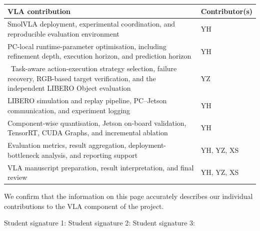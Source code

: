 \documentclass[11pt,a4paper]{article}
\begin{document}
\begin{center}
  \small
  \setlength{\tabcolsep}{5pt}
  \renewcommand{\arraystretch}{1.15}
  \begin{tabular}{@{}p{}p{}@{}}
    \toprule
    VLA contribution & Contributor(s) \\
    \midrule
    SmolVLA deployment, experimental coordination, and reproducible
    evaluation environment
      & YH \\

    PC-local runtime-parameter optimisation, including refinement depth,
    execution horizon, and prediction horizon
      & YH \\

    \
    Task-aware action-execution strategy selection, failure recovery, RGB-based target verification, and the independent LIBERO Object evaluation
      & YZ \\

    LIBERO simulation and replay pipeline, PC--Jetson communication, and
    experiment logging
      & YH \\

    Component-wise quantisation, Jetson on-board validation, TensorRT,
    CUDA Graphs, and incremental ablation
      & YH \\

    Evaluation metrics, result aggregation, deployment-bottleneck analysis,
    and reporting support
      & YH, YZ, XS \\

    VLA manuscript preparation, result interpretation, and final review
      & YH, YZ, XS \\
    \bottomrule
  \end{tabular}
\end{center}

\medskip

\noindent
We confirm that the information on this page accurately describes our
individual contributions to the VLA component of the project.

\vspace{1cm}
\noindent
Student signature 1: \hrulefill \quad Student signature 2: \hrulefill\quad Student signature 3: \hrulefill

\clearpage

\tableofcontents
\end{document}
